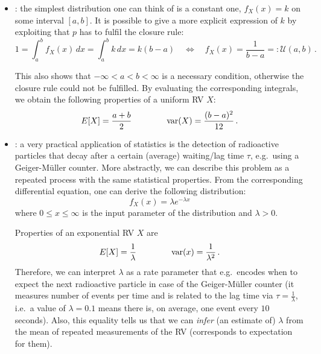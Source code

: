 \begin{ex}
\begin{itemize}
\item {}: the simplest distribution one can think of is a constant one, $f_X(x) = k$ on some interval $[a, b]$. It is possible to give a more explicit expression of $k$ by exploiting that $p$ has to fulfil the closure rule:
\begin{equation}
1 = \int_a^b f_X(x) \, dx = \int_a^b k \, dx = k (b - a) \quad \Leftrightarrow \quad f_X(x) = \frac{1}{b - a} =: \mathcal{U}(a, b) \, .
\end{equation}

This also shows that $- \infty < a < b < \infty$ is a necessary condition, otherwise the closure rule could not be fulfilled. By evaluating the corresponding integrals, we obtain the following properties of a uniform RV $X$:
\begin{equation}
E[X] = \frac{a + b}{2} \qquad \qquad \operatorname{var}(X) = \frac{(b - a)^2}{12} \, .
\end{equation}


\item {}: a very practical application of statistics is the detection of radioactive particles that decay after a certain (average) waiting/lag time $\tau$, e.g.~using a Geiger-Müller counter. More abstractly, we can describe this problem as a repeated process with the same statistical properties. From the corresponding differential equation, one can derive the following distribution:
\begin{equation}\label{eq:exp_distr}
f_X(x) = \lambda e^{- \lambda x}
\end{equation}
where $0 \leq x \leq \infty$ is the input parameter of the distribution and $\lambda > 0$.%

Properties of an exponential RV $X$ are
\begin{equation}
E[X] = \frac{1}{\lambda} \qquad \qquad \operatorname{var}(x) = \frac{1}{\lambda^2} \, .
\end{equation}
Therefore, we can interpret $\lambda$ as a rate parameter that e.g.~encodes when to expect the next radioactive particle in case of the Geiger-Müller counter (it measures number of events per time and is related to the lag time via $\tau = \frac{1}{\lambda}$, i.e.~a value of $\lambda = 0.1$ means there is, on average, one event every $10$ seconds). Also, this equality tells us that we can \emph{infer} (an estimate of) $\lambda$ from the mean of repeated measurements of the RV (corresponds to expectation for them).



\end{itemize}
\end{ex}

